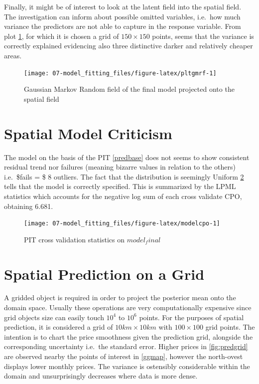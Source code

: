 \documentclass[
  12pt,
  a4paper,
  oneside]{book}
\theoremstyle{definition}
\theoremstyle{definition}
\theoremstyle{definition}
\theoremstyle{remark}
\begin{document}
Finally, it might be of interest to look at the latent field into the spatial field. The investigation can inform about possible omitted variables, i.e.~how much variance the predictors are not able to capture in the response variable. From plot \ref{fig:pltgmrf}, for which it is chosen a grid of \(150 \times 150\) points, seems that the variance is correctly explained evidencing also three distinctive darker and relatively cheaper areas.

\begin{figure}

{\centering \texttt{[image: 07-model\_fitting\_files/figure-latex/pltgmrf-1]} 

}

\caption{Gaussian Markov Random field of the final model projected onto the spatial field}\label{fig:pltgmrf}
\end{figure}

\hypertarget{spatial-model-criticism}{%
\section{Spatial Model Criticism}\label{spatial-model-criticism}}

The model on the basis of the PIT \ref{predbase} does not seems to show consistent residual trend nor failures (meaning bizarre values in relation to the others) i.e.~\$fails = \$ 8 outliers. The fact that the distribution is seemingly Uniform \ref{fig:modelcpo} tells that the model is correctly specified. This is summarized by the LPML statistics which accounts for the negative log sum of each cross validate CPO, obtaining 6.681.

\begin{figure}

{\centering \texttt{[image: 07-model\_fitting\_files/figure-latex/modelcpo-1]} 

}

\caption{PIT cross validation statistics on $model_final$}\label{fig:modelcpo}
\end{figure}

\hypertarget{spatial-prediction-on-a-grid}{%
\section{Spatial Prediction on a Grid}\label{spatial-prediction-on-a-grid}}

A gridded object is required in order to project the posterior mean onto the domain space. Usually these operations are very computationally expensive since grid objects size can easily touch \(10^4\) to \(10^6\) points. For the purposes of spatial prediction, it is considered a grid of \(10km \times 10km\) with \(100 \times 100\) grid points. The intention is to chart the price smoothness given the prediction grid, alongside the corresponding uncertainty i.e.~the standard error.
Higher prices in \ref{fig:predgrid} are observed nearby the points of interest in \ref{ggmap}, however the north-ovest displays lower monthly prices. The variance is ostensibly considerable within the domain and unsurprisingly decreases where data is more dense.
\end{document}
